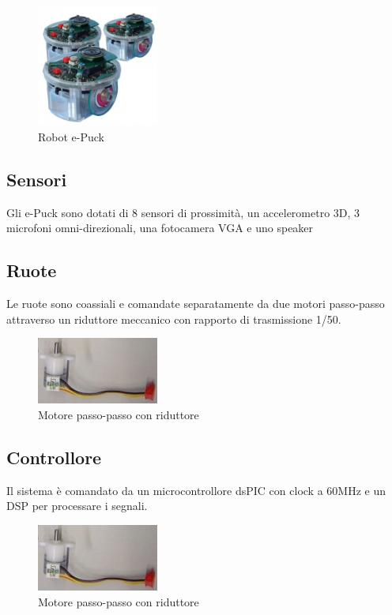 	
	\begin{figure}[h]
	\centering
	\includegraphics[width=4cm]{images/epuck}
	\caption{Robot e-Puck\label{epuck}}
	\end{figure}
	
	\subsection{Sensori}
	Gli e-Puck sono dotati di 8 sensori di prossimit\`a, un accelerometro 3D, 3 microfoni omni-direzionali, una fotocamera VGA e uno speaker
	
	\subsection{Ruote}
	Le ruote sono coassiali e comandate separatamente da due motori passo-passo attraverso un riduttore meccanico con rapporto di trasmissione 1/50.
	\begin{figure}[h]
	\centering
	\includegraphics[width=4cm]{images/motor+cable}
	\caption{Motore passo-passo con riduttore\label{motore}}
	\end{figure}
	\subsection{Controllore}
	Il sistema \`e comandato da un microcontrollore dsPIC con clock a 60MHz e un DSP per processare i segnali.
	\begin{figure}[h]
	\centering
	\includegraphics[width=4cm]{images/motor+cable}
	\caption{Motore passo-passo con riduttore\label{motore}}
	\end{figure}
	
